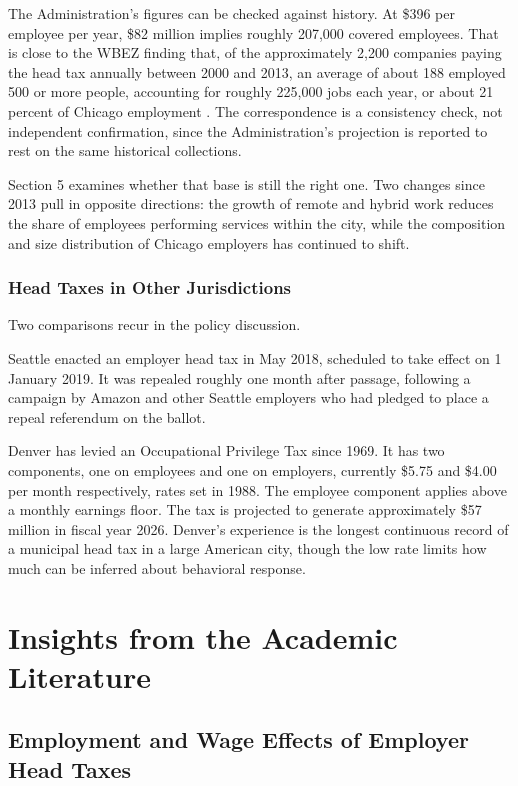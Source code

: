 \documentclass[12pt,letterpaper]{article}
\newif\ifdraft
\newcommand{\NEEDSRC}{\ifdraft\textsuperscript{\textcolor{red}{[src]}}\fi}
\begin{document}
The Administration's figures can be checked against history. At \$396 per employee per year, \$82 million implies roughly 207,000 covered employees. That is close to the WBEZ finding that, of the approximately 2,200 companies paying the head tax annually between 2000 and 2013, an average of about 188 employed 500 or more people, accounting for roughly 225,000 jobs each year, or about 21 percent of Chicago employment \citep{woelfel2025}. The correspondence is a consistency check, not independent confirmation, since the Administration's projection is reported to rest on the same historical collections.

Section 5 examines whether that base is still the right one. Two changes since 2013 pull in opposite directions: the growth of remote and hybrid work reduces the share of employees performing services within the city, while the composition and size distribution of Chicago employers has continued to shift.

\subsubsection{Head Taxes in Other Jurisdictions}

Two comparisons recur in the policy discussion.

Seattle enacted an employer head tax in May 2018, scheduled to take effect on 1 January 2019. It was repealed roughly one month after passage, following a campaign by Amazon and other Seattle employers who had pledged to place a repeal referendum on the ballot.\NEEDSRC{}

Denver has levied an Occupational Privilege Tax since 1969. It has two components, one on employees and one on employers, currently \$5.75 and \$4.00 per month respectively, rates set in 1988. The employee component applies above a monthly earnings floor. The tax is projected to generate approximately \$57 million in fiscal year 2026.\NEEDSRC{} Denver's experience is the longest continuous record of a municipal head tax in a large American city, though the low rate limits how much can be inferred about behavioral response.

\section{Insights from the Academic Literature}

\subsection{Employment and Wage Effects of Employer Head Taxes}
\end{document}
